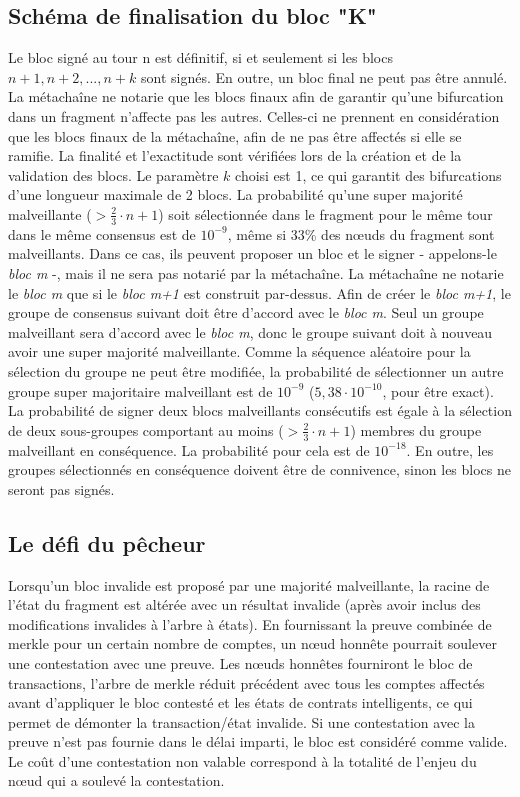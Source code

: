 \documentclass[journal]{IEEEtran}
\begin{document}
\subsection{Schéma de finalisation du bloc "K"}
Le bloc signé au tour n est définitif, si et seulement si les blocs $n + 1, n + 2, ..., n + k$ sont signés. En outre, un bloc final ne peut pas être annulé. La métachaîne ne notarie que les blocs finaux afin de garantir qu'une bifurcation dans un fragment n'affecte pas les autres. Celles-ci ne prennent en considération que les blocs finaux de la métachaîne, afin de ne pas être affectés si elle se ramifie. La finalité et l'exactitude sont vérifiées lors de la création et de la validation des blocs. Le paramètre $k$ choisi est 1, ce qui garantit des bifurcations d'une longueur maximale de 2 blocs. La probabilité qu'une super majorité malveillante ($> \frac{2}{3} \cdot n + 1$) soit sélectionnée dans le fragment pour le même tour dans le même consensus est de $10^{-9}$, même si 33\% des nœuds du fragment sont malveillants. Dans ce cas, ils peuvent proposer un bloc et le signer - appelons-le  \textit{bloc m} -, mais il ne sera pas notarié par la métachaîne. La métachaîne ne notarie le \textit{bloc m} que si le  \textit{bloc m+1} est construit par-dessus. Afin de créer le  \textit{bloc m+1}, le groupe de consensus suivant doit être d'accord avec le  \textit{bloc m}. Seul un groupe malveillant sera d'accord avec le  \textit{bloc m}, donc le groupe suivant doit à nouveau avoir une super majorité malveillante. Comme la séquence aléatoire pour la sélection du groupe ne peut être modifiée, la probabilité de sélectionner un autre groupe super majoritaire malveillant est de $10^{-9}$ ($5,38 \cdot 10^{-10}$, pour être exact). La probabilité de signer deux blocs malveillants consécutifs est égale à la sélection de deux sous-groupes comportant au moins ($> \frac{2}{3} \cdot n + 1$) membres du groupe malveillant en conséquence. La probabilité pour cela est de $10^{-18}$. En outre, les groupes sélectionnés en conséquence doivent être de connivence, sinon les blocs ne seront pas signés.

\subsection{Le défi du pêcheur}
Lorsqu'un bloc invalide est proposé par une majorité malveillante, la racine de l'état du fragment est altérée avec un résultat invalide (après avoir inclus des modifications invalides à l'arbre à états). En fournissant la preuve combinée de merkle pour un certain nombre de comptes, un nœud honnête pourrait soulever une contestation  avec une preuve. Les nœuds honnêtes fourniront le bloc de transactions, l'arbre de merkle réduit précédent avec tous les comptes affectés avant d'appliquer le bloc contesté et les états de contrats intelligents, ce qui permet de démonter la transaction/état invalide. Si une contestation avec la preuve n'est pas fournie dans le délai imparti, le bloc est considéré comme valide. Le coût d'une contestation non valable correspond à la totalité de l'enjeu du nœud qui a soulevé la contestation.
\end{document}
